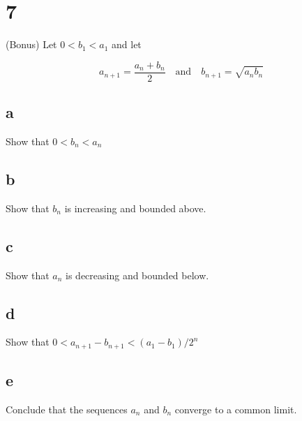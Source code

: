 \documentclass[10pt,letterpaper]{article}
\begin{document}
\section*{7} (Bonus) Let $0 < b_1 < a_1$ and let

\[a_{n+1} = \frac{a_n + b_n}{2} \quad \text{and} \quad b_{n+1} = \sqrt{a_n b_n}\]


\subsection*{a} Show that $0 < b_n < a_n$


\subsection*{b} Show that $b_n$ is increasing and bounded above.


\subsection*{c} Show that $a_n$ is decreasing and bounded below.


\subsection*{d} Show that $ 0 < a_{n+1} - b_{n+1} < (a_1 - b_1)/2^n$


\subsection*{e} Conclude that the sequences $a_n$ and $b_n$ converge to a common limit.
\end{document}
